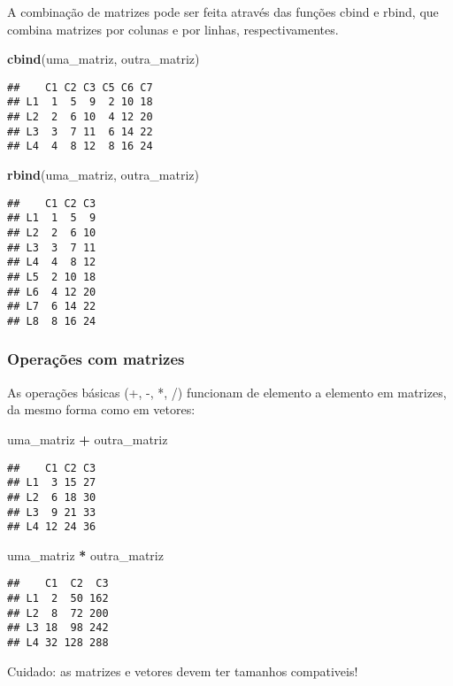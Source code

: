 \documentclass[]{book}
\newenvironment{Shaded}{\begin{snugshade}}{\end{snugshade}}
\newcommand{\KeywordTok}[1]{\textcolor[rgb]{0.13,0.29,0.53}{\textbf{#1}}}
\newcommand{\NormalTok}[1]{#1}
\newcommand{\OperatorTok}[1]{\textcolor[rgb]{0.81,0.36,0.00}{\textbf{#1}}}
\newcommand{\StringTok}[1]{\textcolor[rgb]{0.31,0.60,0.02}{#1}}
\theoremstyle{definition}
\theoremstyle{definition}
\theoremstyle{definition}
\theoremstyle{remark}
\begin{document}
A combinação de matrizes pode ser feita através das funções cbind e rbind, que combina matrizes por colunas e por linhas, respectivamentes.

\begin{Shaded}
\begin{Highlighting}[]
\KeywordTok{cbind}\NormalTok{(uma_matriz, outra_matriz)}
\end{Highlighting}
\end{Shaded}

\begin{verbatim}
##    C1 C2 C3 C5 C6 C7
## L1  1  5  9  2 10 18
## L2  2  6 10  4 12 20
## L3  3  7 11  6 14 22
## L4  4  8 12  8 16 24
\end{verbatim}

\begin{Shaded}
\begin{Highlighting}[]
\KeywordTok{rbind}\NormalTok{(uma_matriz, outra_matriz)}
\end{Highlighting}
\end{Shaded}

\begin{verbatim}
##    C1 C2 C3
## L1  1  5  9
## L2  2  6 10
## L3  3  7 11
## L4  4  8 12
## L5  2 10 18
## L6  4 12 20
## L7  6 14 22
## L8  8 16 24
\end{verbatim}

\hypertarget{operauxe7uxf5es-com-matrizes}{%
\subsubsection{Operações com matrizes}\label{operauxe7uxf5es-com-matrizes}}

As operações básicas (+, -, *, /) funcionam de elemento a elemento em matrizes, da mesmo forma como em vetores:

\begin{Shaded}
\begin{Highlighting}[]
\NormalTok{uma_matriz }\OperatorTok{+}\StringTok{ }\NormalTok{outra_matriz}
\end{Highlighting}
\end{Shaded}

\begin{verbatim}
##    C1 C2 C3
## L1  3 15 27
## L2  6 18 30
## L3  9 21 33
## L4 12 24 36
\end{verbatim}

\begin{Shaded}
\begin{Highlighting}[]
\NormalTok{uma_matriz }\OperatorTok{*}\StringTok{ }\NormalTok{outra_matriz}
\end{Highlighting}
\end{Shaded}

\begin{verbatim}
##    C1  C2  C3
## L1  2  50 162
## L2  8  72 200
## L3 18  98 242
## L4 32 128 288
\end{verbatim}

Cuidado: as matrizes e vetores devem ter tamanhos compativeis!


\end{document}
